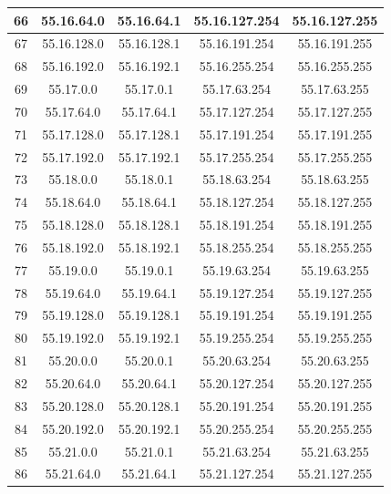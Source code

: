 \documentclass[letterpaper,12pt]{article}
\begin{document}
\begin{center}
\begin{longtable}{|c|c|c|c|c|}
                66 & 55.16.64.0 & 55.16.64.1 & 55.16.127.254 & 55.16.127.255 \\ \hline
                67 & 55.16.128.0 & 55.16.128.1 & 55.16.191.254 & 55.16.191.255 \\ \hline
                68 & 55.16.192.0 & 55.16.192.1 & 55.16.255.254 & 55.16.255.255 \\ \hline
                69 & 55.17.0.0 & 55.17.0.1 & 55.17.63.254 & 55.17.63.255 \\ \hline
                70 & 55.17.64.0 & 55.17.64.1 & 55.17.127.254 & 55.17.127.255 \\ \hline
                71 & 55.17.128.0 & 55.17.128.1 & 55.17.191.254 & 55.17.191.255 \\ \hline
                72 & 55.17.192.0 & 55.17.192.1 & 55.17.255.254 & 55.17.255.255 \\ \hline
                73 & 55.18.0.0 & 55.18.0.1 & 55.18.63.254 & 55.18.63.255 \\ \hline
                74 & 55.18.64.0 & 55.18.64.1 & 55.18.127.254 & 55.18.127.255 \\ \hline
                75 & 55.18.128.0 & 55.18.128.1 & 55.18.191.254 & 55.18.191.255 \\ \hline
                76 & 55.18.192.0 & 55.18.192.1 & 55.18.255.254 & 55.18.255.255 \\ \hline
                77 & 55.19.0.0 & 55.19.0.1 & 55.19.63.254 & 55.19.63.255 \\ \hline
                78 & 55.19.64.0 & 55.19.64.1 & 55.19.127.254 & 55.19.127.255 \\ \hline
                79 & 55.19.128.0 & 55.19.128.1 & 55.19.191.254 & 55.19.191.255 \\ \hline
                80 & 55.19.192.0 & 55.19.192.1 & 55.19.255.254 & 55.19.255.255 \\ \hline
                81 & 55.20.0.0 & 55.20.0.1 & 55.20.63.254 & 55.20.63.255 \\ \hline
                82 & 55.20.64.0 & 55.20.64.1 & 55.20.127.254 & 55.20.127.255 \\ \hline
                83 & 55.20.128.0 & 55.20.128.1 & 55.20.191.254 & 55.20.191.255 \\ \hline
                84 & 55.20.192.0 & 55.20.192.1 & 55.20.255.254 & 55.20.255.255 \\ \hline
                85 & 55.21.0.0 & 55.21.0.1 & 55.21.63.254 & 55.21.63.255 \\ \hline
                86 & 55.21.64.0 & 55.21.64.1 & 55.21.127.254 & 55.21.127.255 \\ \hline

\end{longtable}
\end{center}
\end{document}
